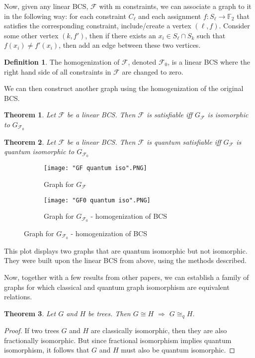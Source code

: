 \documentclass[12pt]{article}
\newtheorem{Theorem}{Theorem}
\theoremstyle{definition}
\newtheorem{defn}{Definition}[section]
\theoremstyle{proposition}
\theoremstyle{lemma}
\begin{document}
Now, given any linear BCS, $\mathcal{F}$ with m constraints, we can associate a graph to it in the following way: for each constraint $C_{\ell}$ and each assignment $f:S_{\ell} \rightarrow \mathbb{F}_2$ that satisfies the corresponding constraint, include/create a vertex $(\ell, f)$. Consider some other vertex $(k, f')$, then if there exists an $x_i \in S_{\ell} \cap S_{k}$ such that $f(x_i) \neq  f'(x_i)$, then add an edge between these two vertices.

\begin{defn}
The homogenization of $\mathcal{F}$, denoted $\mathcal{F}_0$, is a linear BCS where the right hand side of all constraints in $\mathcal{F}$ are changed to zero.
\end{defn}
We can then construct another graph using the homogenization of the original BCS.


\begin{Theorem}
Let $\mathcal{F}$ be a linear BCS. Then $\mathcal{F}$ is satisfiable iff $G_{\mathcal{F}}$ is isomorphic to $G_{\mathcal{F}_0}$
\end{Theorem}

\begin{Theorem}
Let $\mathcal{F}$ be a linear BCS. Then $\mathcal{F}$ is quantum satisfiable iff $G_{\mathcal{F}}$ is quantum isomorphic to $G_{\mathcal{F}_0}$
\end{Theorem}




\begin{figure}
  \begin{subfigure}[b]{0.4\textwidth}
    \texttt{[image: "GF quantum iso".PNG]}
    \caption{Graph for $G_{\mathcal{F}}$}
    \label{fig:Gf}
  \end{subfigure}
  \begin{subfigure}[b]{0.4\textwidth}
    \texttt{[image: "GF0 quantum iso".PNG]}
    \caption{Graph for $G_{\mathcal{F}_0}$ - homogenization of BCS}
    \label{fig:Gf0}
  \end{subfigure}
\end{figure}

This plot displays two graphs that are quantum isomorphic but not isomorphic. They were built upon the linear BCS from above, using the methods described. 

Now, together with a few results from other papers, we can establish a family of graphs for which classical and quantum graph isomorphism are equivalent relations.

\begin{Theorem}
Let $G$ and $H$ be trees. Then $G \cong H$ $\Rightarrow$ $G \cong_q H$.
\end{Theorem}
\begin{proof}
If two trees $G$ and $H$ are classically isomorphic, then they are also fractionally isomorphic. But since fractional isomorphism implies quantum isomorphism, it follows that $G$ and $H$ must also be quantum isomorphic.
\end{proof}


\newpage



\end{document}

